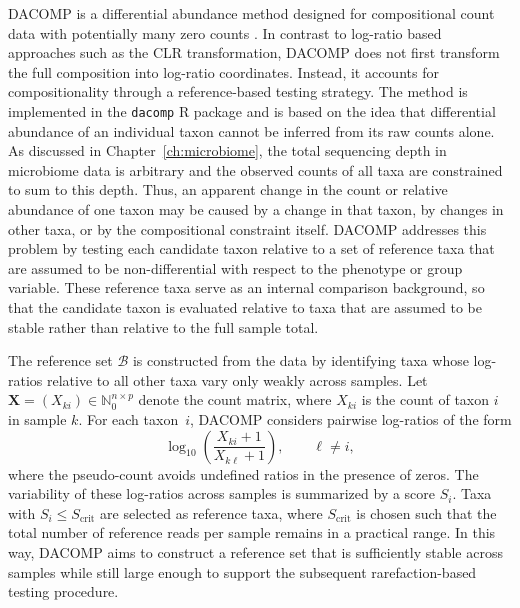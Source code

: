 DACOMP is a differential abundance method designed for compositional count data with potentially many zero counts \citep{brill2022testing}. In contrast to log-ratio based approaches such as the CLR transformation, DACOMP does not first transform the full composition into log-ratio coordinates. Instead, it accounts for compositionality through a reference-based testing strategy. The method is implemented in the \texttt{dacomp} R package and is based on the idea that differential abundance of an individual taxon cannot be inferred from its raw counts alone. As discussed in Chapter~\ref{ch:microbiome}, the total sequencing depth in microbiome data is arbitrary and the observed counts of all taxa are constrained to sum to this depth. Thus, an apparent change in the count or relative abundance of one taxon may be caused by a change in that taxon, by changes in other taxa, or by the compositional constraint itself. DACOMP addresses this problem by testing each candidate taxon relative to a set of reference taxa that are assumed to be non-differential with respect to the phenotype or group variable. These reference taxa serve as an internal comparison background, so that the candidate taxon is evaluated relative to taxa that are assumed to be stable rather than relative to the full sample total.

The reference set $\mathcal{B}$ is constructed from the data by identifying taxa whose log-ratios relative to all other taxa vary only weakly across samples. Let $\mathbf{X} = (X_{ki}) \in \mathbb{N}_0^{n \times p}$ denote the count matrix, where $X_{ki}$ is the count of taxon $i$ in sample $k$. For each taxon~$i$, DACOMP considers pairwise log-ratios of the form
\begin{equation}
	\log_{10}\!\left(\frac{X_{ki}+1}{X_{k\ell}+1}\right), \qquad \ell \neq i,
	\label{eq:4feature:dacomp_log_ratios}
\end{equation}
where the pseudo-count avoids undefined ratios in the presence of zeros. The variability of these log-ratios across samples is summarized by a score $S_i$. Taxa with $S_i \leq S_{\mathrm{crit}}$ are selected as reference taxa, where $S_{\mathrm{crit}}$ is chosen such that the total number of reference reads per sample remains in a practical range. In this way, DACOMP aims to construct a reference set that is sufficiently stable across samples while still large enough to support the subsequent rarefaction-based testing procedure.

